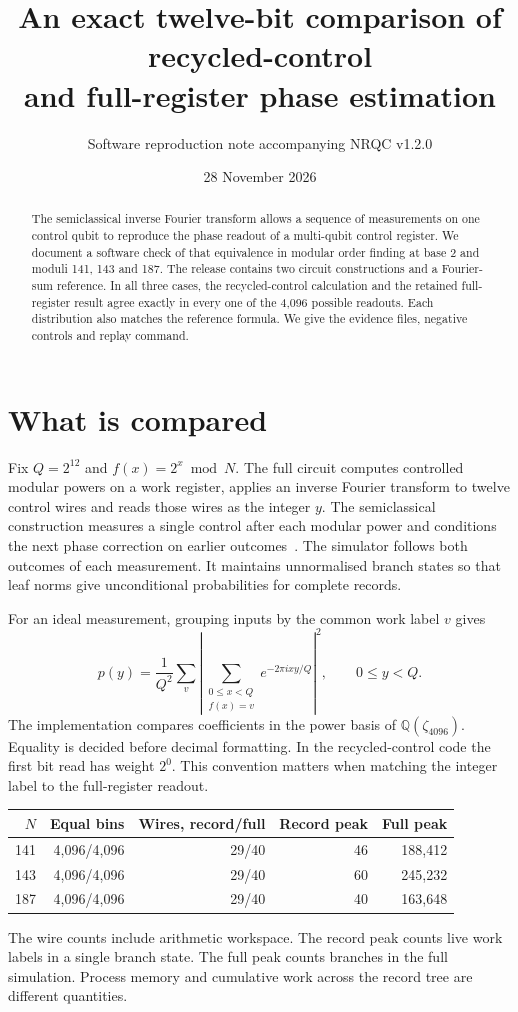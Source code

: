 \documentclass[11pt]{article}
\title{\textbf{An exact twelve-bit comparison of recycled-control\\ and full-register phase estimation}}
\author{Software reproduction note accompanying NRQC v1.2.0}
\date{28 November 2026}
\begin{document}
\maketitle
\begin{abstract}
The semiclassical inverse Fourier transform allows a sequence of measurements on one control qubit to reproduce the phase readout of a multi-qubit control register. We document a software check of that equivalence in modular order finding at base 2 and moduli 141, 143 and 187. The release contains two circuit constructions and a Fourier-sum reference. In all three cases, the recycled-control calculation and the retained full-register result agree exactly in every one of the 4,096 possible readouts. Each distribution also matches the reference formula. We give the evidence files, negative controls and replay command.
\end{abstract}

\section*{What is compared}
Fix \(Q=2^{12}\) and \(f(x)=2^x\bmod N\). The full circuit computes controlled modular powers on a work register, applies an inverse Fourier transform to twelve control wires and reads those wires as the integer \(y\). The semiclassical construction measures a single control after each modular power and conditions the next phase correction on earlier outcomes~\cite{gn}. The simulator follows both outcomes of each measurement. It maintains unnormalised branch states so that leaf norms give unconditional probabilities for complete records.

For an ideal measurement, grouping inputs by the common work label \(v\) gives
\[
 p(y)=\frac{1}{Q^2}\sum_v
          \left|\sum_{\substack{0\leq x<Q\\ f(x)=v}}
                 e^{-2\pi ixy/Q}\right|^2,\qquad 0\leq y<Q.
\]
The implementation compares coefficients in the power basis of \(\mathbb Q(\zeta_{4096})\). Equality is decided before decimal formatting. In the recycled-control code the first bit read has weight \(2^0\). This convention matters when matching the integer label to the full-register readout.

\begin{center}
\begin{tabular}{r r r r r}
\toprule
\(N\) & Equal bins & Wires, record/full & Record peak & Full peak\\
\midrule
141 & 4,096/4,096 & 29/40 & 46 & 188,412\\
143 & 4,096/4,096 & 29/40 & 60 & 245,232\\
187 & 4,096/4,096 & 29/40 & 40 & 163,648\\
\bottomrule
\end{tabular}
\end{center}
The wire counts include arithmetic workspace. The record peak counts live work labels in a single branch state. The full peak counts branches in the full simulation. Process memory and cumulative work across the record tree are different quantities.
\end{document}
